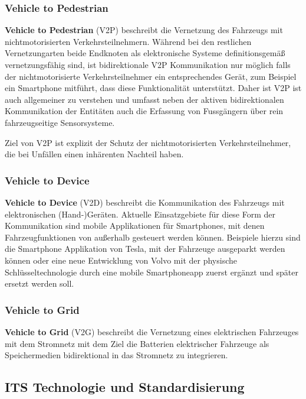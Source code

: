     \subsubsection{Vehicle to Pedestrian}
    \textbf{Vehicle to Pedestrian} (V2P) beschreibt die Vernetzung des Fahrzeugs mit nichtmotorisierten Verkehrsteilnehmern.
    Während bei den restlichen Vernetzungarten beide Endknoten als elektronische Systeme definitionsgemäß vernetzungsfähig sind, ist bidirektionale V2P Kommunikation nur möglich
    falls der nichtmotorisierte Verkehrsteilnehmer ein entsprechendes Gerät, zum Beispiel ein Smartphone mitführt, dass diese Funktionalität unterstützt.
    Daher ist V2P ist auch allgemeiner zu verstehen und umfasst neben der aktiven bidirektionalen Kommunikation der Entitäten auch die Erfassung von Fussgängern über rein
    fahrzeugseitige Sensorsysteme.

    Ziel von V2P ist explizit der Schutz der nichtmotorisierten Verkehrsteilnehmer, die bei Unfällen einen inhärenten Nachteil haben.

    \subsubsection{Vehicle to Device}
    \textbf{Vehicle to Device} (V2D) beschreibt die Kommunikation des Fahrzeugs mit elektronischen (Hand-)Geräten. Aktuelle Einsatzgebiete für diese Form der Kommunikation
    sind mobile Applikationen für Smartphones, mit denen Fahrzeugfunktionen von außerhalb gesteuert werden können. Beispiele hierzu
    sind die Smartphone Applikation von Tesla, mit der Fahrzeuge ausgeparkt werden können oder eine neue Entwicklung von Volvo mit der physische Schlüsseltechnologie
    durch eine mobile Smartphoneapp zuerst ergänzt und später ersetzt werden soll. ~\cite{BP05}
     
    \subsubsection{Vehicle to Grid}
    \textbf{Vehicle to Grid} (V2G) beschreibt die Vernetzung eines elektrischen Fahrzeuges mit dem Stromnetz mit dem Ziel die Batterien elektrischer Fahrzeuge als Speichermedien
    bidirektional in das Stromnetz zu integrieren. \cite{BP08}

    \subsection{ITS Technologie und Standardisierung}

